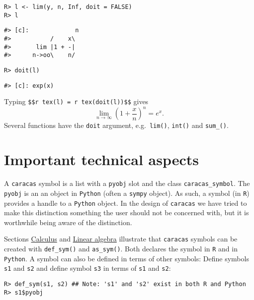 \begin{verbatim}
R> l <- lim(y, n, Inf, doit = FALSE)
R> l
\end{verbatim}

\begin{verbatim}
#> [c]:             n
#>           /    x\ 
#>       lim |1 + -| 
#>      n->oo\    n/
\end{verbatim}

\begin{verbatim}
R> doit(l)
\end{verbatim}

\begin{verbatim}
#> [c]: exp(x)
\end{verbatim}

Typing \texttt{\$\$\textasciigrave{}r\ tex(l)\textasciigrave{}\ =\ \textasciigrave{}r\ tex(doit(l))\textasciigrave{}\$\$} gives
\[
\lim_{n \to \infty} \left(1 + \frac{x}{n}\right)^{n} = e^{x} .
\]
Several functions have the \texttt{doit} argument, e.g.~\texttt{lim()}, \texttt{int()} and \texttt{sum\_()}.

\hypertarget{important-technical-aspects}{%
\section{Important technical aspects}\label{important-technical-aspects}}

A \texttt{caracas} symbol is a list with a \texttt{pyobj} slot and the class
\texttt{caracas\_symbol}. The \texttt{pyobj} is an an object in \texttt{Python}
(often a \texttt{sympy} object). As such, a symbol (in \texttt{R})
provides a handle to a \texttt{Python} object. In the design of
\texttt{caracas} we have tried to make this distinction something the
user should not be concerned with, but it is worthwhile being aware of
the distinction.

Sections \protect\hyperlink{calculus}{Calculus} and \protect\hyperlink{linear-algebra}{Linear algebra} illustrate that \texttt{caracas} symbols can
be created with \texttt{def\_sym()} and \texttt{as\_sym()}. Both declares the
symbol in \texttt{R} and in \texttt{Python}. A symbol can also be
defined in terms of other symbols:
Define symbols \texttt{s1} and \texttt{s2} and define symbol \texttt{s3} in terms of \texttt{s1} and \texttt{s2}:

\begin{verbatim}
R> def_sym(s1, s2) ## Note: 's1' and 's2' exist in both R and Python
R> s1$pyobj
\end{verbatim}

